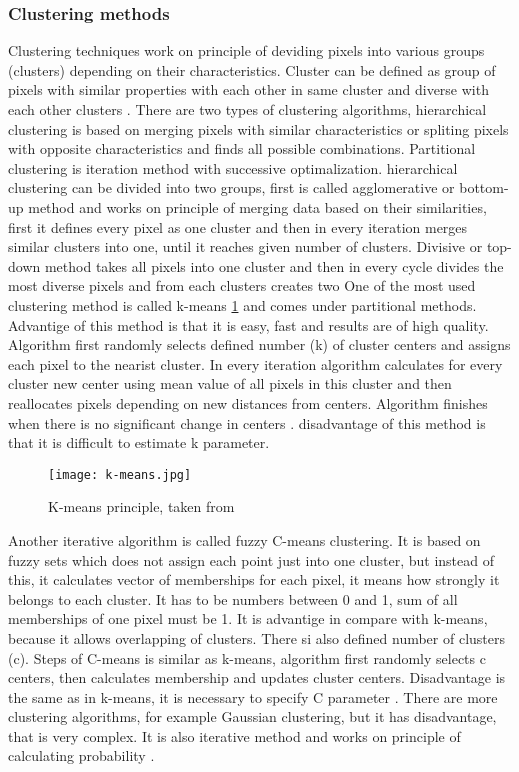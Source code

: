\subsubsection{Clustering methods}

        Clustering techniques work on principle of deviding pixels into various groups (clusters) depending on their characteristics. Cluster can be defined as group of pixels
        with similar properties with each other in same cluster and diverse with each other clusters \cite{26}. There are two types of clustering algorithms, hierarchical clustering
        is based on merging pixels with similar characteristics or spliting pixels with opposite characteristics and finds all possible combinations. Partitional clustering
        is iteration method with successive optimalization. hierarchical clustering can be divided into two groups, first is called agglomerative or bottom-up method and
        works on principle of merging data based on their similarities, first it defines every pixel as one cluster and then in every iteration merges similar clusters into one, until
        it reaches given number of clusters. Divisive or top-down method takes all pixels into one cluster and then in every cycle divides the most diverse pixels and from each clusters
        creates two \cite{25, 26} One of the most used clustering method is called k-means \ref{fig:k-means} and comes under partitional methods. Advantige of this method is that it is easy, fast and results are
        of high quality. Algorithm first randomly selects defined number (k) of cluster centers and assigns each pixel to the nearist cluster. In every iteration algorithm
        calculates for every cluster new center using mean value of all pixels in this cluster and then reallocates pixels depending on new distances from centers.
        Algorithm finishes when there is no significant change in centers \cite{26}. disadvantage of this method is that it is difficult to estimate k parameter.

        \begin{figure}[h]
            \texttt{[image: k-means.jpg]}
            \caption{K-means principle, taken from \cite{24}}
            \label{fig:k-means}
        \end{figure}

        Another iterative algorithm is called fuzzy C-means clustering. It is based on fuzzy sets which does not assign each point just into one cluster, but instead of this,
        it calculates vector of memberships for each pixel, it means how strongly it belongs to each cluster. It has to be numbers between 0 and 1, sum of all memberships of one pixel must be 1.
        It is advantige in compare with k-means, because it allows overlapping of clusters. There si also defined number of clusters (c). Steps of C-means is similar as k-means,
        algorithm first randomly selects c centers, then calculates membership and updates cluster centers. Disadvantage is the same as in k-means,
        it is necessary to specify C parameter \cite{26, 27, 28}. There are more clustering algorithms, for example Gaussian clustering, but it has disadvantage, that is very complex.
        It is also iterative method and works on principle of calculating probability \cite{27}.

